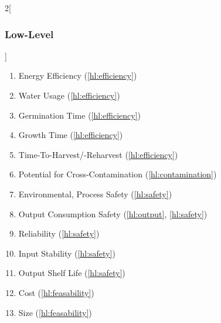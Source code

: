 \documentclass{report}
\begin{document}
\begin{multicols}{2}[\subsubsection{Low-Level}\label{sec:llos}]
\begin{enumerate}[label=LL\arabic*., ref=LL\arabic*]
        \item \label{ll:efficiency_energy} Energy Efficiency \hfill (\ref{hl:efficiency})
        \item \label{ll:efficiency_water} Water Usage \hfill (\ref{hl:efficiency})
        \item \label{ll:time_germination} Germination Time \hfill (\ref{hl:efficiency})
        \item \label{ll:time_growth} Growth Time \hfill (\ref{hl:efficiency})
        \item \label{ll:time_harvest} Time-To-Harvest/-Reharvest \hfill (\ref{hl:efficiency})
        \item \label{ll:crosscontamination} Potential for Cross-Contamination \hfill (\ref{hl:contamination})
        \item \label{ll:safety_process} Environmental, Process Safety \hfill (\ref{hl:safety})
        \item \label{ll:output_safety} Output Consumption Safety \hfill (\ref{hl:output}, \ref{hl:safety})
        \item \label{ll:reliability} Reliability \hfill (\ref{hl:safety})
        \item \label{ll:stability_input} Input Stability \hfill (\ref{hl:safety})
        \item \label{ll:stability_output} Output Shelf Life \hfill (\ref{hl:safety})
        \item \label{ll:cost} Cost \hfill (\ref{hl:feasability})
        \item \label{ll:size} Size \hfill (\ref{hl:feasability})
    \end{enumerate}
\end{multicols}
\end{document}
